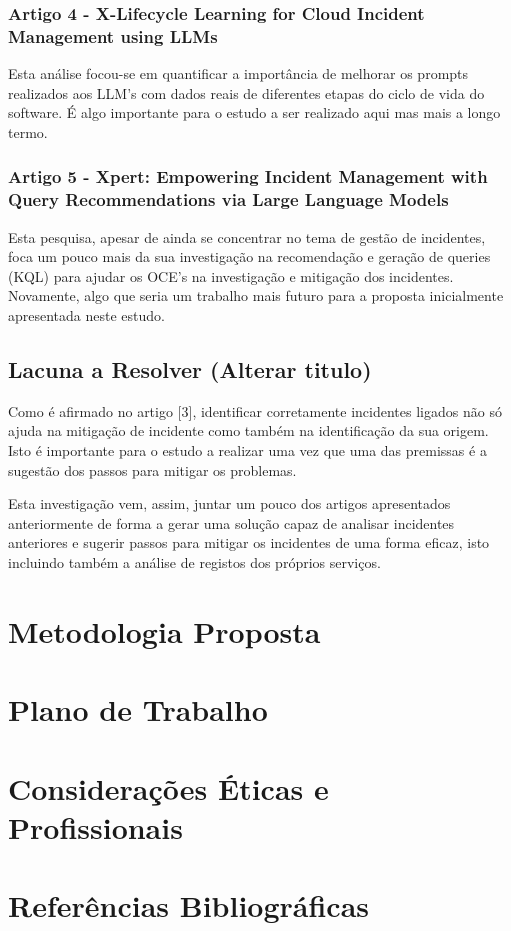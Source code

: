 		\subsubsection{Artigo 4 - X-Lifecycle Learning for Cloud Incident Management using LLMs}
			Esta análise focou-se em quantificar a importância de melhorar os prompts realizados aos LLM's com dados reais de diferentes etapas do ciclo de vida do software. É algo importante para o estudo a ser realizado aqui mas mais a longo termo.
		
		\subsubsection{Artigo 5 - Xpert: Empowering Incident Management with Query Recommendations via Large Language Models}
			Esta pesquisa, apesar de ainda se concentrar no tema de gestão de incidentes, foca um pouco mais da sua investigação na recomendação e geração de queries (KQL) para ajudar os OCE's na investigação e mitigação dos incidentes. Novamente, algo que seria um trabalho mais futuro para a proposta inicialmente apresentada neste estudo.
		
	\subsection{Lacuna a Resolver (Alterar titulo)}
		Como é afirmado no artigo [3], identificar corretamente incidentes ligados não só ajuda na mitigação de incidente como também na identificação da sua origem. Isto é importante para o estudo a realizar uma vez que uma das premissas é a sugestão dos passos para mitigar os problemas.
		
		Esta investigação vem, assim, juntar um pouco dos artigos apresentados anteriormente de forma a gerar uma solução capaz de analisar incidentes anteriores e sugerir passos para mitigar os incidentes de uma forma eficaz, isto incluindo também a análise de registos dos próprios serviços.

\section{Metodologia Proposta}


\section{Plano de Trabalho}


\section{Considerações Éticas e Profissionais}


\section{Referências Bibliográficas}
